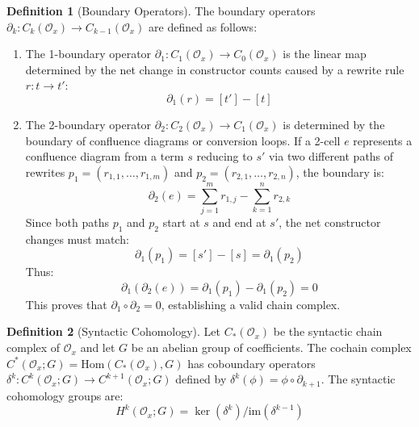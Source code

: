 \documentclass{article}
\theoremstyle{definition}
\newtheorem{definition}{Definition}[section]
\theoremstyle{plain}
\begin{document}
\begin{definition}[Boundary Operators]
The boundary operators $\partial_k : C_k(\mathcal{O}_x) \to C_{k-1}(\mathcal{O}_x)$ are defined as follows:
\begin{enumerate}
    \item The 1-boundary operator $\partial_1 : C_1(\mathcal{O}_x) \to C_0(\mathcal{O}_x)$ is the linear map determined by the net change in constructor counts caused by a rewrite rule $r : t \to t'$:
    \[ \partial_1(r) = [t'] - [t] \]
    \item The 2-boundary operator $\partial_2 : C_2(\mathcal{O}_x) \to C_1(\mathcal{O}_x)$ is determined by the boundary of confluence diagrams or conversion loops. If a 2-cell $e$ represents a confluence diagram from a term $s$ reducing to $s'$ via two different paths of rewrites $p_1 = (r_{1,1}, \dots, r_{1,m})$ and $p_2 = (r_{2,1}, \dots, r_{2,n})$, the boundary is:
    \[ \partial_2(e) = \sum_{j=1}^m r_{1,j} - \sum_{k=1}^n r_{2,k} \]
    Since both paths $p_1$ and $p_2$ start at $s$ and end at $s'$, the net constructor changes must match:
    \[ \partial_1(p_1) = [s'] - [s] = \partial_1(p_2) \]
    Thus:
    \[ \partial_1(\partial_2(e)) = \partial_1(p_1) - \partial_1(p_2) = 0 \]
    This proves that $\partial_1 \circ \partial_2 = 0$, establishing a valid chain complex.
\end{enumerate}
\end{definition}

\begin{definition}[Syntactic Cohomology]
Let $C_*(\mathcal{O}_x)$ be the syntactic chain complex of $\mathcal{O}_x$ and let $G$ be an abelian group of coefficients. The cochain complex $C^*(\mathcal{O}_x; G) = \mathrm{Hom}(C_*(\mathcal{O}_x), G)$ has coboundary operators $\delta^k : C^k(\mathcal{O}_x; G) \to C^{k+1}(\mathcal{O}_x; G)$ defined by $\delta^k(\phi) = \phi \circ \partial_{k+1}$.
The syntactic cohomology groups are:
\[ H^k(\mathcal{O}_x; G) = \ker(\delta^k) / \mathrm{im}(\delta^{k-1}) \]
\end{definition}
\end{document}
